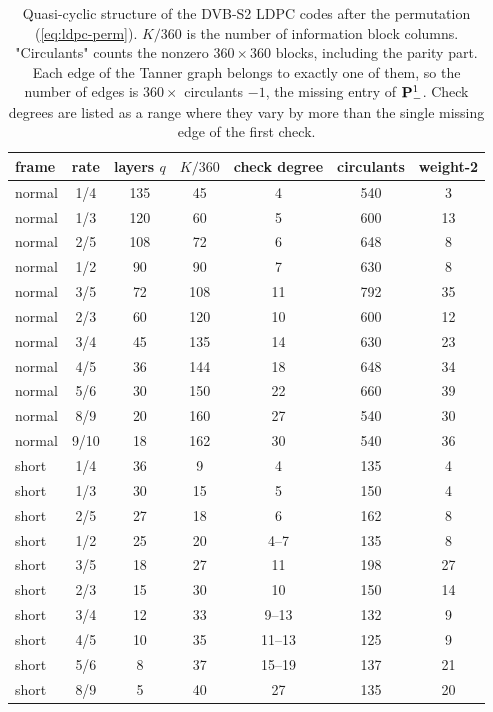 \begin{table} \centering
\begin{tabular}{|l|c|c|c|c|c|c|}
\hline
frame & rate & layers \(q\) & \(K/360\) & check degree & circulants & weight-2 \\
\hline
normal & 1/4 & 135 & 45 & 4 & 540 & 3 \\
normal & 1/3 & 120 & 60 & 5 & 600 & 13 \\
normal & 2/5 & 108 & 72 & 6 & 648 & 8 \\
normal & 1/2 & 90 & 90 & 7 & 630 & 8 \\
normal & 3/5 & 72 & 108 & 11 & 792 & 35 \\
normal & 2/3 & 60 & 120 & 10 & 600 & 12 \\
normal & 3/4 & 45 & 135 & 14 & 630 & 23 \\
normal & 4/5 & 36 & 144 & 18 & 648 & 34 \\
normal & 5/6 & 30 & 150 & 22 & 660 & 39 \\
normal & 8/9 & 20 & 160 & 27 & 540 & 30 \\
normal & 9/10 & 18 & 162 & 30 & 540 & 36 \\
short & 1/4 & 36 & 9 & 4 & 135 & 4 \\
short & 1/3 & 30 & 15 & 5 & 150 & 4 \\
short & 2/5 & 27 & 18 & 6 & 162 & 8 \\
short & 1/2 & 25 & 20 & 4--7 & 135 & 8 \\
short & 3/5 & 18 & 27 & 11 & 198 & 27 \\
short & 2/3 & 15 & 30 & 10 & 150 & 14 \\
short & 3/4 & 12 & 33 & 9--13 & 132 & 9 \\
short & 4/5 & 10 & 35 & 11--13 & 125 & 9 \\
short & 5/6 & 8 & 37 & 15--19 & 137 & 21 \\
short & 8/9 & 5 & 40 & 27 & 135 & 20 \\
\hline
\end{tabular}
\caption{Quasi-cyclic structure of the DVB-S2 LDPC codes after the permutation (\ref{eq:ldpc-perm}). \(K/360\) is the number of information block columns. "Circulants" counts the nonzero \(360 \times 360\) blocks, including the parity part. Each edge of the Tanner graph belongs to exactly one of them, so the number of edges is \(360 \times\) circulants \(- 1\), the missing entry of \(\mathbf{P}^1_-\). Check degrees are listed as a range where they vary by more than the single missing edge of the first check.} \label{tb:ldpc-structure}
\end{table}

